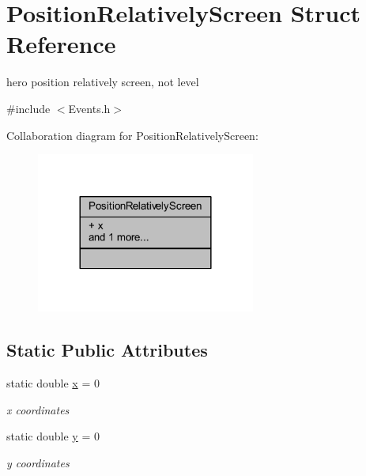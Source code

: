 \hypertarget{struct_position_relatively_screen}{}\section{Position\+Relatively\+Screen Struct Reference}
\label{struct_position_relatively_screen}


hero position relatively screen, not level  




{\ttfamily \#include $<$Events.\+h$>$}



Collaboration diagram for Position\+Relatively\+Screen\+:
\nopagebreak
\begin{figure}[H]
\begin{center}
\leavevmode
\includegraphics[width=204pt]{struct_position_relatively_screen__coll__graph}
\end{center}
\end{figure}
\subsection*{Static Public Attributes}
\begin{DoxyCompactItemize}
\item 
\mbox{\label{struct_position_relatively_screen_ac1e997b81f9705f4a76f1bf9df9f9fd9}} 
static double \hyperlink{struct_position_relatively_screen_ac1e997b81f9705f4a76f1bf9df9f9fd9}{x} = 0
\begin{DoxyCompactList}\small\item\em x coordinates \end{DoxyCompactList}\item 
\mbox{\label{struct_position_relatively_screen_a1b0b578732e926941d2b5533bcc16c62}} 
static double \hyperlink{struct_position_relatively_screen_a1b0b578732e926941d2b5533bcc16c62}{y} = 0
\begin{DoxyCompactList}\small\item\em y coordinates \end{DoxyCompactList}\end{DoxyCompactItemize}


